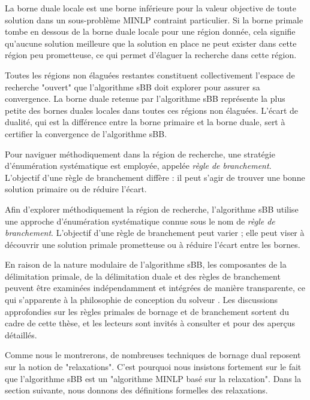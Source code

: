    La borne duale locale est une borne inférieure pour la valeur objective de toute solution dans un sous-problème MINLP contraint particulier. Si la borne primale tombe en dessous de la borne duale locale pour une région donnée, cela signifie qu'aucune solution meilleure que la solution en place ne peut exister dans cette région peu prometteuse, ce qui permet d'élaguer la recherche dans cette région.

   Toutes les régions non élaguées restantes constituent collectivement l'espace de recherche "ouvert" que l'algorithme sBB doit explorer pour assurer sa convergence. La borne duale retenue par l'algorithme sBB représente la plus petite des bornes duales locales dans toutes ces régions non élaguées. L'écart de dualité, qui est la différence entre la borne primaire et la borne duale, sert à certifier la convergence de l'algorithme sBB.

   Pour naviguer méthodiquement dans la région de recherche, une stratégie d'énumération systématique est employée, appelée \emph{règle de branchement}.  L'objectif d'une règle de branchement diffère : il peut s'agir de trouver une bonne solution primaire ou de réduire l'écart. 
   
  
  
  Afin d'explorer méthodiquement la région de recherche, l'algorithme sBB utilise une approche d'énumération systématique connue sous le nom de \emph{règle de branchement}. L'objectif d'une règle de branchement peut varier ; elle peut viser à découvrir une solution primale prometteuse ou à réduire l'écart entre les bornes.
  
  En raison de la nature modulaire de l'algorithme sBB, les composantes de la délimitation primale, de la délimitation duale et des règles de branchement peuvent être examinées indépendamment et intégrées de manière transparente, ce qui s'apparente à la philosophie de conception du solveur \scip \cite{bestuzheva2023global}. Les discussions approfondies sur les règles primales de bornage et de branchement sortent du cadre de cette thèse, et les lecteurs sont invités à consulter \cite{belotti2009branching} et \cite{berthold2015heuristic} pour des aperçus détaillés.
  
  Comme nous le montrerons, de nombreuses techniques de bornage dual reposent sur la notion de "relaxations". C'est pourquoi nous insistons fortement sur le fait que l'algorithme sBB est un "algorithme MINLP basé sur la relaxation". Dans la section suivante, nous donnons des définitions formelles des relaxations.
  
